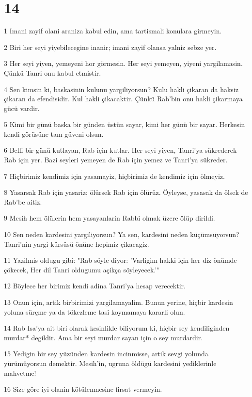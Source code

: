 \chapter{14}

\par 1 Imani zayif olani araniza kabul edin, ama tartismali konulara girmeyin.
\par 2 Biri her seyi yiyebilecegine inanir; imani zayif olansa yalniz sebze yer.
\par 3 Her seyi yiyen, yemeyeni hor görmesin. Her seyi yemeyen, yiyeni yargilamasin. Çünkü Tanri onu kabul etmistir.
\par 4 Sen kimsin ki, baskasinin kulunu yargiliyorsun? Kulu hakli çikaran da haksiz çikaran da efendisidir. Kul hakli çikacaktir. Çünkü Rab'bin onu hakli çikarmaya gücü vardir.
\par 5 Kimi bir günü baska bir günden üstün sayar, kimi her günü bir sayar. Herkesin kendi görüsüne tam güveni olsun.
\par 6 Belli bir günü kutlayan, Rab için kutlar. Her seyi yiyen, Tanri'ya sükrederek Rab için yer. Bazi seyleri yemeyen de Rab için yemez ve Tanri'ya sükreder.
\par 7 Hiçbirimiz kendimiz için yasamayiz, hiçbirimiz de kendimiz için ölmeyiz.
\par 8 Yasarsak Rab için yasariz; ölürsek Rab için ölürüz. Öyleyse, yasasak da ölsek de Rab'be aitiz.
\par 9 Mesih hem ölülerin hem yasayanlarin Rabbi olmak üzere ölüp dirildi.
\par 10 Sen neden kardesini yargiliyorsun? Ya sen, kardesini neden küçümsüyorsun? Tanri'nin yargi kürsüsü önüne hepimiz çikacagiz.
\par 11 Yazilmis oldugu gibi: "Rab söyle diyor: 'Varligim hakki için her diz önümde çökecek, Her dil Tanri oldugumu açikça söyleyecek.'"
\par 12 Böylece her birimiz kendi adina Tanri'ya hesap verecektir.
\par 13 Onun için, artik birbirimizi yargilamayalim. Bunun yerine, hiçbir kardesin yoluna sürçme ya da tökezleme tasi koymamaya kararli olun.
\par 14 Rab Isa'ya ait biri olarak kesinlikle biliyorum ki, hiçbir sey kendiliginden murdar* degildir. Ama bir seyi murdar sayan için o sey murdardir.
\par 15 Yedigin bir sey yüzünden kardesin incinmisse, artik sevgi yolunda yürümüyorsun demektir. Mesih'in, ugruna öldügü kardesini yediklerinle mahvetme!
\par 16 Size göre iyi olanin kötülenmesine firsat vermeyin.

